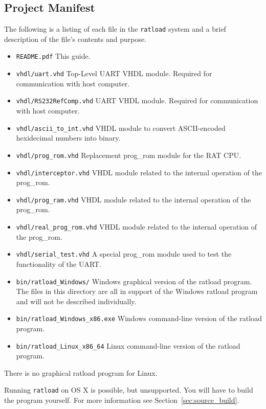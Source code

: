 \documentclass[notitlepage]{article}
\newcommand{\infosign}{\fontencoding{U}\fontfamily{futs}\huge\selectfont\char 116\relax}
\begin{document}
\subsection{Project Manifest}
The following is a listing of each file in the \texttt{ratload} system and a brief description of the file's contents and purpose.
\begin{itemize}
\item \texttt{README.pdf} This guide.
\item \texttt{vhdl/uart.vhd} Top-Level UART VHDL module. Required for communication with host computer.
\item \texttt{vhdl/RS232RefComp.vhd} UART VHDL module. Required for communication with host computer.
\item \texttt{vhdl/ascii\_to\_int.vhd} VHDL module to convert ASCII-encoded hexidecimal numbers into binary.
\item \texttt{vhdl/prog\_rom.vhd} Replacement prog\_rom module for the RAT CPU.
\item \texttt{vhdl/interceptor.vhd} VHDL module related to the internal operation of the prog\_rom.
\item \texttt{vhdl/prog\_ram.vhd} VHDL module related to the internal operation of the prog\_rom.
\item \texttt{vhdl/real\_prog\_rom.vhd} VHDL module related to the internal operation of the prog\_rom.
\item \texttt{vhdl/serial\_test.vhd} A special prog\_rom module used to test the functionality of the UART.
\item \texttt{bin/ratload\_Windows/} Windows graphical version of the ratload program. The files in this directory are all in support of the Windows ratload program and will not be described individually.
\item \texttt{bin/ratload\_Windows\_x86.exe} Windows command-line version of the ratload program.
\item \texttt{bin/ratload\_Linux\_x86\_64} Linux command-line version of the ratload program.
\end{itemize}
There is no graphical ratload program for Linux.

\begin{infobox}
  {\infosign} Running \texttt{ratload} on OS X is possible, but unsupported. You will have to build the program yourself. For more information see Section~\ref{sec:source_build}.
\end{infobox}
\end{document}
